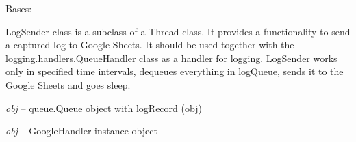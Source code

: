 \documentclass[letterpaper,10pt,english]{sphinxmanual}
\begin{document}

\begin{fulllineitems}
\label{rpicameramon:rpicameramon.telemetry.LogSender}
Bases: 

LogSender class is a subclass of a Thread class.
It provides a functionality to send a captured log to
Google Sheets. It should be used together with the
logging.handlers.QueueHandler class as a handler for logging.
LogSender works only in specified time intervals,
dequeues everything in logQueue, sends it
to the Google Sheets and goes sleep.

\begin{fulllineitems}
\label{rpicameramon:rpicameramon.telemetry.LogSender.logQueue}
\emph{obj} -- queue.Queue object with logRecord (obj)

\end{fulllineitems}


\begin{fulllineitems}
\label{rpicameramon:rpicameramon.telemetry.LogSender.enqueued}
\end{fulllineitems}


\begin{fulllineitems}
\label{rpicameramon:rpicameramon.telemetry.LogSender.googleHandler}
\emph{obj} -- GoogleHandler instance object

\end{fulllineitems}


\begin{fulllineitems}
\label{rpicameramon:rpicameramon.telemetry.LogSender.run}
\end{fulllineitems}


\end{fulllineitems}
\end{document}
